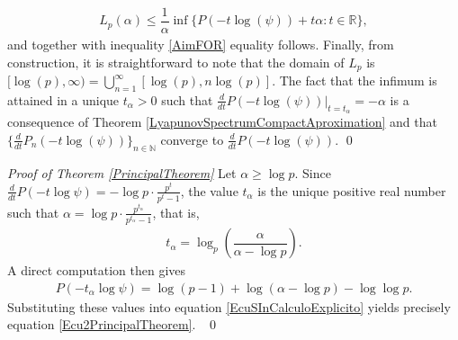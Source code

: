 \documentclass[11pt]{amsart}
\theoremstyle{remark}
\numberwithin{equation}{section}
\newcommand{\N}{\mathbb{N}}
\newcommand{\R}{\mathbb{R}}
\begin{document}
\begin{align*}
    L_{p}(\alpha)\leq \dfrac{1}{\alpha}\inf\{P(-t\log(\psi))+t\alpha:t\in \R \},
\end{align*}and together with inequality \eqref{AimFOR} equality follows. Finally, from construction, it is straightforward to note that the domain of $L_{p}$ is  $[\log(p),\infty)=\bigcup_{n=1}^{\infty}[\log(p),n\log(p)]$. The fact that the infimum is attained in a unique $t_{\alpha}>0$ such that $\frac{d}{dt}P(-t\log(\psi))|_{t=t_{\alpha}}=-\alpha$ is a consequence of Theorem \ref{LyapunovSpectrumCompactAproximation} and that $\{\frac{d}{dt}P_{n}(-t\log(\psi))\}_{n\in \N}$ converge to $\frac{d}{dt}P(-t\log(\psi))$. \qed

\textit{Proof of Theorem \ref{PrincipalTheorem}} Let $\alpha\geq\log p $. Since $\frac{d}{dt}P(-t\log \psi )=-\log p \cdot \frac{p^{t}}{p^{t}-1}$, the value  $t_{\alpha}$ is the unique positive real number such that $\alpha=\log p\cdot \frac{p^{t_\alpha}}{p^{t_\alpha}-1}$, that is,
\begin{align*}
    t_{\alpha}=\log_{p}\left(\dfrac{\alpha}{\alpha-\log p}\right).
\end{align*} A direct computation then gives 
\begin{align*}
    P(-t_{\alpha}\log \psi)=\log(p-1)+\log(\alpha-\log p)-\log\log p.
\end{align*}Substituting these values into equation \eqref{EcuSInCalculoExplicito} yields precisely equation \eqref{Ecu2PrincipalTheorem}. \
\qed  
\end{document}
